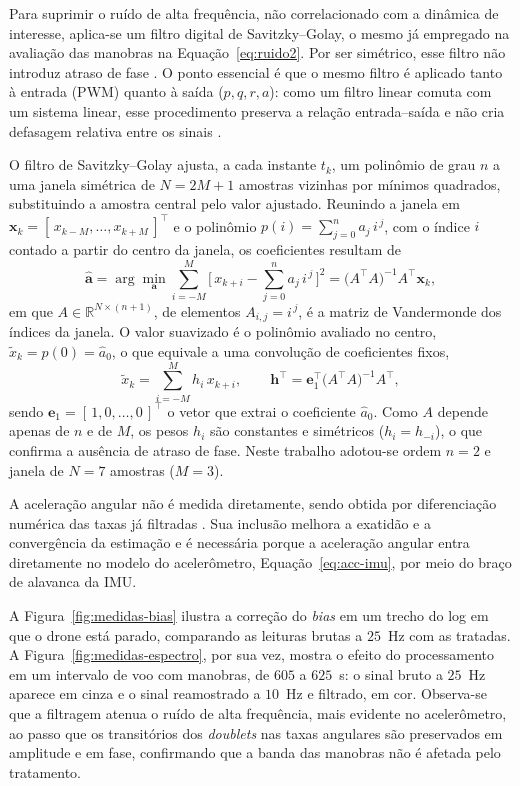 Para suprimir o ruído de alta frequência, não correlacionado com a dinâmica de interesse, aplica-se um filtro digital de Savitzky--Golay, o mesmo já empregado na avaliação das manobras na Equação~\eqref{eq:ruido2}. Por ser simétrico, esse filtro não introduz atraso de fase \cite{Jategaonkar2015}. O ponto essencial é que o mesmo filtro é aplicado tanto à entrada (PWM) quanto à saída ($p,q,r,a$): como um filtro linear comuta com um sistema linear, esse procedimento preserva a relação entrada--saída e não cria defasagem relativa entre os sinais \cite{Tischler2012}.

O filtro de Savitzky--Golay ajusta, a cada instante $t_k$, um polinômio de grau $n$ a uma janela simétrica de $N = 2M+1$ amostras vizinhas por mínimos quadrados, substituindo a amostra central pelo valor ajustado. Reunindo a janela em $\mathbf{x}_k = [\,x_{k-M},\dots,x_{k+M}\,]^\top$ e o polinômio $p(i) = \sum_{j=0}^{n} a_j\,i^{\,j}$, com o índice $i$ contado a partir do centro da janela, os coeficientes resultam de
\begin{equation}
\hat{\mathbf{a}} = \arg\min_{\mathbf{a}} \sum_{i=-M}^{M}\!\bigg[\,x_{k+i} - \sum_{j=0}^{n} a_j\,i^{\,j}\,\bigg]^2 = \big(A^\top A\big)^{-1} A^\top \mathbf{x}_k,
\label{eq:sg-fit}
\end{equation}
em que $A \in \mathbb{R}^{N\times(n+1)}$, de elementos $A_{i,j} = i^{\,j}$, é a matriz de Vandermonde dos índices da janela. O valor suavizado é o polinômio avaliado no centro, $\tilde{x}_k = p(0) = \hat{a}_0$, o que equivale a uma convolução de coeficientes fixos,
\begin{equation}
\tilde{x}_k = \sum_{i=-M}^{M} h_i\, x_{k+i},
\qquad
\mathbf{h}^\top = \mathbf{e}_1^\top \big(A^\top A\big)^{-1} A^\top,
\label{eq:sg-conv}
\end{equation}
sendo $\mathbf{e}_1 = [\,1,0,\dots,0\,]^\top$ o vetor que extrai o coeficiente $\hat{a}_0$. Como $A$ depende apenas de $n$ e de $M$, os pesos $h_i$ são constantes e simétricos ($h_i = h_{-i}$), o que confirma a ausência de atraso de fase. Neste trabalho adotou-se ordem $n = 2$ e janela de $N = 7$ amostras ($M = 3$).

A aceleração angular não é medida diretamente, sendo obtida por diferenciação numérica das taxas já filtradas \cite{Jategaonkar2015}. Sua inclusão melhora a exatidão e a convergência da estimação e é necessária porque a aceleração angular entra diretamente no modelo do acelerômetro, Equação~\eqref{eq:acc-imu}, por meio do braço de alavanca da IMU. 

A Figura~\ref{fig:medidas-bias} ilustra a correção do \textit{bias} em um trecho do log em que o drone está parado, comparando as leituras brutas a $25$~Hz com as tratadas. A Figura~\ref{fig:medidas-espectro}, por sua vez, mostra o efeito do processamento em um intervalo de voo com manobras, de $605$ a $625$~s: o sinal bruto a $25$~Hz aparece em cinza e o sinal reamostrado a $10$~Hz e filtrado, em cor. Observa-se que a filtragem atenua o ruído de alta frequência, mais evidente no acelerômetro, ao passo que os transitórios dos \textit{doublets} nas taxas angulares são preservados em amplitude e em fase, confirmando que a banda das manobras não é afetada pelo tratamento.

